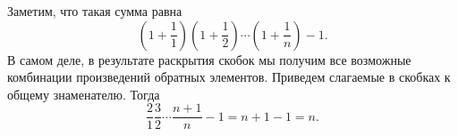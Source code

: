 \documentclass{article}
\begin{document}
Заметим, что такая сумма равна $$\left( 1 + \frac11 \right) \left( 1 + \frac12 \right) \cdots \left( 1 + \frac{1}{n} \right) - 1.$$
В самом деле, в результате раскрытия скобок мы получим все возможные комбинации произведений обратных элементов. Приведем слагаемые в скобках к общему знаменателю. Тогда
$$\frac21 \frac32 \cdots \frac{n+1}{n} - 1 = n+1 - 1 = n.$$
\end{document}
